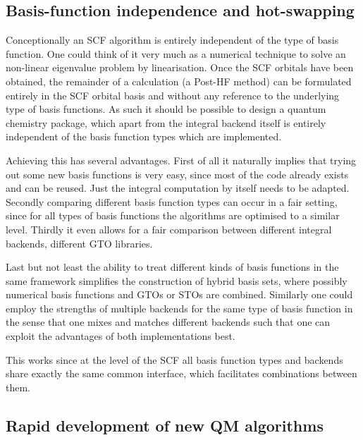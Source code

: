 \subsection{Basis-function independence and hot-swapping}
Conceptionally an SCF algorithm is entirely independent of the type of basis function.
One could think of it very much as a numerical technique to solve
an non-linear eigenvalue problem by linearisation.
Once the SCF orbitals have been obtained,
the remainder of a calculation (\eg a Post-HF method)
can be formulated entirely in the SCF orbital basis
and without any reference to the underlying type of basis functions.
As such it should be possible to design a quantum chemistry package,
which apart from the integral backend itself is entirely independent
of the basis function types which are implemented.

Achieving this has several advantages.
First of all it naturally implies that trying out some new basis functions is very easy,
since most of the code already exists and can be reused.
Just the integral computation by itself needs to be adapted.
Secondly comparing different basis function types can occur in a fair setting,
since for all types of basis functions the algorithms are optimised to a similar level.
Thirdly it even allows for a fair comparison between different integral backends,
\eg different GTO libraries.

Last but not least the ability to treat different kinds of basis functions
in the same framework simplifies the construction of hybrid basis sets,
where possibly numerical basis functions and GTOs or STOs are combined.
Similarly one could employ the strengths of multiple backends for the same type of basis function
in the sense that one mixes and matches different backends such that one can exploit
the advantages of both implementations best.

This works since at the level of the SCF all basis function types and backends
share exactly the same common interface,
which facilitates combinations between them.


\subsection{Rapid development of new QM algorithms}

